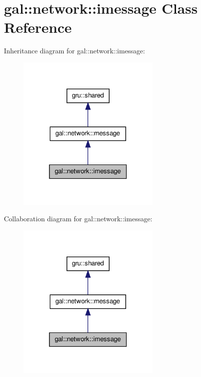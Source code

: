 \hypertarget{classgal_1_1network_1_1imessage}{\section{gal\-:\-:network\-:\-:imessage \-Class \-Reference}
\label{classgal_1_1network_1_1imessage}
}


\-Inheritance diagram for gal\-:\-:network\-:\-:imessage\-:
\nopagebreak
\begin{figure}[H]
\begin{center}
\leavevmode
\includegraphics[width=198pt]{classgal_1_1network_1_1imessage__inherit__graph}
\end{center}
\end{figure}


\-Collaboration diagram for gal\-:\-:network\-:\-:imessage\-:
\nopagebreak
\begin{figure}[H]
\begin{center}
\leavevmode
\includegraphics[width=198pt]{classgal_1_1network_1_1imessage__coll__graph}
\end{center}
\end{figure}
